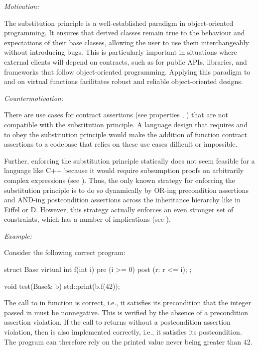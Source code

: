 
\emph{Motivation:}

The substitution principle is a well-established paradigm in object-oriented programming. It ensures that derived classes remain true to the behaviour and expectations of their base classes, allowing the user to use them interchangeably without introducing bugs. This is particularly important in situations where external clients will depend on contracts, such as for public APIs, libraries, and frameworks that follow object-oriented programming. Applying this paradigm to  and  on virtual functions facilitates robust and reliable object-oriented designs.

\emph{Countermotivation:}

There are use cases for contract assertions (see properties , ) that are not compatible with the substitution principle. A language design that requires  and  to obey the substitution principle would make the addition of function contract assertions to a codebase that relies on these use cases difficult or impossible.

Further, enforcing the substitution principle statically does not seem feasible for a language like C++ because it would require subsumption proofs on arbitrarily complex expressions (see \cite{P3165R0}). Thus, the only known  strategy for enforcing the substitution principle is to do so dynamically by OR-ing precondition assertions and AND-ing postcondition assertions across the inheritance hierarchy like in Eiffel or D. However, this strategy actually enforces an even stronger set of constraints, which has a number of implications (see ).

\emph{Example:}

Consider the following correct program:
\begin{codeblock}
struct Base {
  virtual int f(int i)
    pre (i >= 0)
    post (r: r <= i);
};

void test(Base& b) {
  std::print(b.f(42));
}
\end{codeblock}
The call to  in function  is correct, i.e., it satisfies its precondition that the integer passed in must be nonnegative. This is verified by the absence of a precondition assertion violation. If the call to  returns without a postcondition assertion violation, then  is also implemented correctly, i.e., it satisfies its postcondition. The program can therefore rely on  the printed value never being greater than 42.

